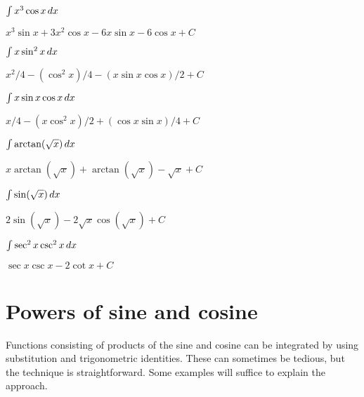 \begin{exercises}
\begin{exercise} $\int x^3\cos x\, d x$
\begin{answer} $x^3\sin x+3x^2\cos x-6x\sin x-6\cos x+C$
\end{answer}\end{exercise}

\begin{exercise} $\int x\sin^2 x\, d x$
\begin{answer} $x^2/4-(\cos^2 x)/4-(x\sin x\cos x)/2+C$
\end{answer}\end{exercise}

\begin{exercise} $\int x\sin x\cos x\, d x$
\begin{answer} $x/4-(x\cos^2 x)/2+(\cos x\sin x)/4+C$
\end{answer}\end{exercise}

\begin{exercise} $\int \arctan(\sqrt x)\, d x$
\begin{answer} $x\arctan(\sqrt x)+\arctan(\sqrt x)-\sqrt{x}+C$
\end{answer}\end{exercise}

\begin{exercise} $\int \sin(\sqrt x)\, d x$
\begin{answer} $2\sin(\sqrt x)-2\sqrt x\cos(\sqrt x)+C$
\end{answer}\end{exercise}

\begin{exercise} $\int\sec^2 x\csc^2 x\, d x$
\begin{answer} $\sec x\csc x-2\cot x+C$
\end{answer}\end{exercise}

\endtwocol

\end{exercises}



\section{Powers of sine and cosine}


Functions consisting of products of the sine and cosine can be
integrated by using substitution and trigonometric identities. These
can sometimes be tedious, but the technique is straightforward. Some
examples will suffice to explain the approach.

